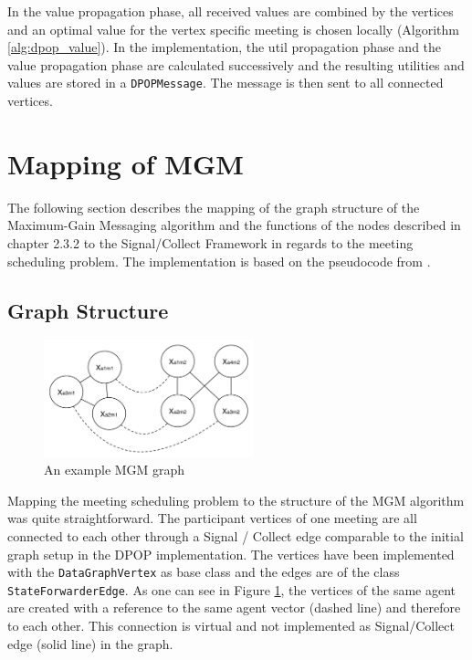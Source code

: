 \vspace{7 mm}
In the value propagation phase, all received values are combined by the vertices and an optimal value for the vertex specific meeting is chosen locally (Algorithm \ref{alg:dpop_value}). In the implementation, the util propagation phase and the value propagation phase are calculated successively and the resulting utilities and values are stored in a \texttt{DPOPMessage}. The message is then sent to all connected vertices.

\section{Mapping of MGM}

The following section describes the mapping of the graph structure of the Maximum-Gain Messaging algorithm and the functions of the nodes described in chapter 2.3.2 to the Signal/Collect Framework in regards to the meeting scheduling problem. The implementation is based on the pseudocode from \cite{Chapman2010}.

\subsection{Graph Structure}
\begin{figure}[H]
\includegraphics[width=230px]{graphics/mgm_graph}
\centering
\caption{An example MGM graph}
\label{fig:mgm_graph}
\end{figure}

Mapping the meeting scheduling problem to the structure of the MGM algorithm was quite straightforward. The participant vertices of one meeting are all connected to each other through a Signal / Collect edge comparable to the initial graph setup in the DPOP implementation. The vertices have been implemented with the \texttt{DataGraphVertex} as base class and the edges are of the class \texttt{StateForwarderEdge}. As one can see in Figure \ref{fig:mgm_graph}, the vertices of the same agent are created with a reference to the same agent vector (dashed line) and therefore to each other. This connection is virtual and not implemented as Signal/Collect edge (solid line) in the graph.

